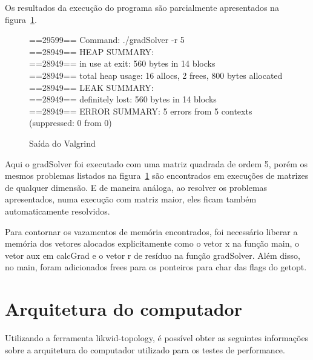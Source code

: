 \documentclass[12pt]{article}
\begin{document}
Os resultados da execução do programa são parcialmente apresentados na
figura~\ref{fig:valgrindOut}.

\begin{figure}[htb]
\begin{tt}\noindent
==29599== Command: ./gradSolver -r 5\\
==28949== HEAP SUMMARY:\\
==28949==     in use at exit: 560 bytes in 14 blocks\\
==28949==   total heap usage: 16 allocs, 2 frees, 800 bytes allocated\\
==28949== LEAK SUMMARY:\\
==28949==    definitely lost: 560 bytes in 14 blocks\\
==28949== ERROR SUMMARY: 5 errors from 5 contexts (suppressed: 0 from 0)
\end{tt}\caption{Saída do Valgrind}\label{fig:valgrindOut}
\end{figure}

Aqui o gradSolver foi executado com uma matriz quadrada de ordem 5, porém os
mesmos problemas listados na figura~\ref{fig:valgrindOut} são encontrados em
execuções de matrizes de qualquer dimensão. E de maneira análoga, ao resolver os
problemas apresentados, numa execução com matriz maior, eles ficam também
automaticamente resolvidos.

Para contornar os vazamentos de memória encontrados, foi necessário liberar a
memória dos vetores alocados explicitamente como o vetor x na função main, o
vetor aux em calcGrad e o vetor r de resíduo na função gradSolver. Além disso,
no main, foram adicionados frees para os ponteiros para char das flags do
getopt.

\section{Arquitetura do computador}\label{sec:likwid}

Utilizando a ferramenta likwid-topology, é possível obter as seguintes
informações sobre a arquitetura do computador utilizado para os testes de
performance.
\end{document}
